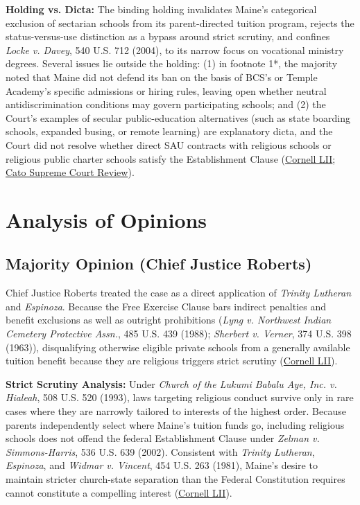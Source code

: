\documentclass[12pt]{article}
\begin{document}
\textbf{Holding vs. Dicta:} The binding holding invalidates Maine's categorical exclusion of sectarian schools from its parent-directed tuition program, rejects the status-versus-use distinction as a bypass around strict scrutiny, and confines \textit{Locke v. Davey}, 540 U.S. 712 (2004), to its narrow focus on vocational ministry degrees. Several issues lie outside the holding: (1) in footnote 1*, the majority noted that Maine did not defend its ban on the basis of BCS's or Temple Academy's specific admissions or hiring rules, leaving open whether neutral antidiscrimination conditions may govern participating schools; and (2) the Court's examples of secular public-education alternatives (such as state boarding schools, expanded busing, or remote learning) are explanatory dicta, and the Court did not resolve whether direct SAU contracts with religious schools or religious public charter schools satisfy the Establishment Clause (\href{https://www.law.cornell.edu/supremecourt/text/20-1088}{Cornell LII}; \href{https://www.cato.org/supreme-court-review/2021-2022/use-nondistinction}{Cato Supreme Court Review}).

\section{Analysis of Opinions}

\subsection{Majority Opinion (Chief Justice Roberts)}

Chief Justice Roberts treated the case as a direct application of \textit{Trinity Lutheran} and \textit{Espinoza}. Because the Free Exercise Clause bars indirect penalties and benefit exclusions as well as outright prohibitions (\textit{Lyng v. Northwest Indian Cemetery Protective Assn.}, 485 U.S. 439 (1988); \textit{Sherbert v. Verner}, 374 U.S. 398 (1963)), disqualifying otherwise eligible private schools from a generally available tuition benefit because they are religious triggers strict scrutiny (\href{https://www.law.cornell.edu/supremecourt/text/20-1088}{Cornell LII}).

\textbf{Strict Scrutiny Analysis:} Under \textit{Church of the Lukumi Babalu Aye, Inc. v. Hialeah}, 508 U.S. 520 (1993), laws targeting religious conduct survive only in rare cases where they are narrowly tailored to interests of the highest order. Because parents independently select where Maine's tuition funds go, including religious schools does not offend the federal Establishment Clause under \textit{Zelman v. Simmons-Harris}, 536 U.S. 639 (2002). Consistent with \textit{Trinity Lutheran}, \textit{Espinoza}, and \textit{Widmar v. Vincent}, 454 U.S. 263 (1981), Maine's desire to maintain stricter church-state separation than the Federal Constitution requires cannot constitute a compelling interest (\href{https://www.law.cornell.edu/supremecourt/text/20-1088}{Cornell LII}).
\end{document}
